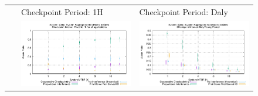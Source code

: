 \documentclass[conference]{IEEEtran}
\begin{document}
\begin{figure}[t]
\noindent\begin{tabular}{C{.02\linewidth}C{.49\linewidth}C{.49\linewidth}}
     ~    &  Checkpoint Period: 1H & Checkpoint Period: Daly \\
 & \includegraphics[width=\linewidth]{sim/figures/40gbs-1hckpt-waste-celio.pdf} & \includegraphics[width=\linewidth]{sim/figures/40gbs-dalyckpt-waste-celio.pdf} \\

\end{tabular}
\end{figure}
\end{document}
